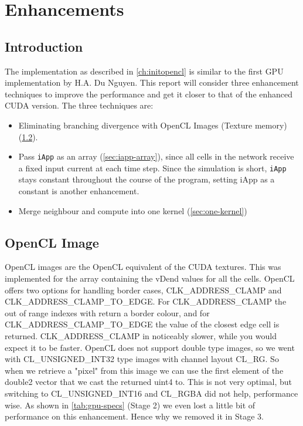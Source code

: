 \documentclass[final]{report}
\begin{document}
\chapter{Enhancements}\label{ch:enhancements}

\section{Introduction}
The implementation as described in \cref{ch:initopencl} is similar to the first GPU implementation by H.A. Du Nguyen.
This report will consider three enhancement techniques to improve the performance and get it closer to that of the enhanced CUDA version.
The three techniques are:
\begin{itemize}
	\item Eliminating branching divergence with OpenCL Images (Texture memory) (\cref{sec:image-texture}).
	\item Pass \texttt{iApp} as an array (\cref{sec:iapp-array}), since all cells in the network receive a fixed input current at each time step. Since the simulation is short, \texttt{iApp} stays constant throughout the course of the program, setting iApp as a constant is another enhancement.
	\item Merge neighbour and compute into one kernel (\cref{sec:one-kernel})
\end{itemize}

\section{OpenCL Image}\label{sec:image-texture}
OpenCL images are the OpenCL equivalent of the CUDA textures.
This was implemented for the array containing the vDend values for all the cells.
OpenCL offers two options for handling border cases, CLK\_ADDRESS\_CLAMP and CLK\_ADDRESS\_CLAMP\_TO\_EDGE.
For CLK\_ADDRESS\_CLAMP the out of range indexes with return a border colour, and for CLK\_ADDRESS\_CLAMP\_TO\_EDGE the value of the closest edge cell is returned.
CLK\_ADDRESS\_CLAMP in noticeably slower, while you would expect it to be faster.
OpenCL does not support double type images, so we went with CL\_UNSIGNED\_INT32 type images with channel layout CL\_RG.
So when we retrieve a "pixel" from this image we can use the first element of the double2 vector that we cast the returned uint4 to.
This is not very optimal, but switching to CL\_UNSIGNED\_INT16 and CL\_RGBA  did not help, performance wise.
As shown in \cref{tab:gpu-specs} (Stage 2) we even lost a little bit of performance on this enhancement.
Hence why we removed it in Stage 3.
\end{document}
